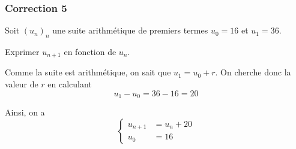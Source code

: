 \documentclass[15pt, mathserif]{beamer}
\begin{document}
\begin{frame}
\vspace{-10mm}
	\frametitle{Correction 5}
Soit $(u_n)_n$ une suite arithmétique de premiers termes $u_0=16$ et $u_1=36$. 
 
 Exprimer $u_{n+1}$ en fonction de $u_n$. 
 
 \vspace*{1cm} 
 
 Comme la suite est arithmétique, on sait que $u_1=u_0+r$. On cherche donc la valeur de $r$ en calculant $$u_1-u_0=36-16=20$$ 
 
 Ainsi, on a $$ \left\{ 
 \begin{array}{ll} 
 u_{n+1} &= u_n +20 \\ 
 u_0 & = 16 
 \end{array} 
 \right. $$ 
 \end{frame}
\end{document}

